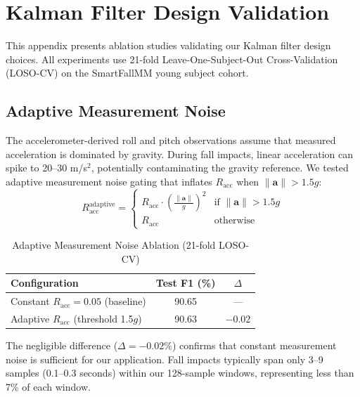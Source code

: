 \appendix

\section{Kalman Filter Design Validation}
\label{sec:kalman_ablation}

This appendix presents ablation studies validating our Kalman filter design choices. All experiments use 21-fold Leave-One-Subject-Out Cross-Validation (LOSO-CV) on the SmartFallMM young subject cohort.

\subsection{Adaptive Measurement Noise}

The accelerometer-derived roll and pitch observations assume that measured acceleration is dominated by gravity. During fall impacts, linear acceleration can spike to 20--30 m/s$^2$, potentially contaminating the gravity reference. We tested adaptive measurement noise gating that inflates $R_{\text{acc}}$ when $\|\mathbf{a}\| > 1.5g$:
\begin{equation}
R_{\text{acc}}^{\text{adaptive}} = \begin{cases}
R_{\text{acc}} \cdot \left(\frac{\|\mathbf{a}\|}{g}\right)^2 & \text{if } \|\mathbf{a}\| > 1.5g \\
R_{\text{acc}} & \text{otherwise}
\end{cases}
\end{equation}

\begin{table}[htbp]
\centering
\caption{Adaptive Measurement Noise Ablation (21-fold LOSO-CV)}
\label{tab:adaptive_racc}
\begin{tabular}{@{}lcc@{}}
\toprule
\textbf{Configuration} & \textbf{Test F1 (\%)} & \textbf{$\Delta$} \\
\midrule
Constant $R_{\text{acc}} = 0.05$ (baseline) & 90.65 & --- \\
Adaptive $R_{\text{acc}}$ (threshold 1.5$g$) & 90.63 & $-0.02$ \\
\bottomrule
\end{tabular}
\end{table}

The negligible difference ($\Delta = -0.02\%$) confirms that constant measurement noise is sufficient for our application. Fall impacts typically span only 3--9 samples (0.1--0.3 seconds) within our 128-sample windows, representing less than 7\% of each window.

